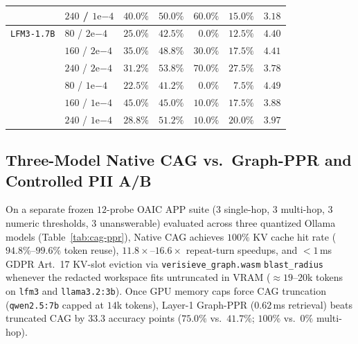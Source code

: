 \documentclass{article}
\begin{document}
\begin{table}[t]
\begin{center}
\begin{tabular}{llrrrrr}
 & $240$ / $1\mathrm{e}{-4}$ & $40.0\%$ & $50.0\%$ & $60.0\%$ & $15.0\%$ & $3.18$ \\
\midrule
\texttt{LFM3-1.7B} & $80$ / $2\mathrm{e}{-4}$ & $25.0\%$ & $42.5\%$ & $0.0\%$ & $12.5\%$ & $4.40$ \\
 & $160$ / $2\mathrm{e}{-4}$ & $35.0\%$ & $48.8\%$ & $30.0\%$ & $17.5\%$ & $4.41$ \\
 & $240$ / $2\mathrm{e}{-4}$ & $31.2\%$ & $53.8\%$ & $70.0\%$ & $27.5\%$ & $3.78$ \\
 & $80$ / $1\mathrm{e}{-4}$ & $22.5\%$ & $41.2\%$ & $0.0\%$ & $7.5\%$ & $4.49$ \\
 & $160$ / $1\mathrm{e}{-4}$ & $45.0\%$ & $45.0\%$ & $10.0\%$ & $17.5\%$ & $3.88$ \\
 & $240$ / $1\mathrm{e}{-4}$ & $28.8\%$ & $51.2\%$ & $10.0\%$ & $20.0\%$ & $3.97$ \\
\bottomrule
\end{tabular}
\end{center}
\vskip -0.14in
\end{table}

\subsection{Three-Model Native CAG vs.\ Graph-PPR and Controlled PII A/B}
On a separate frozen $12$-probe OAIC APP suite ($3$ single-hop, $3$ multi-hop, $3$ numeric thresholds, $3$ unanswerable) evaluated across three quantized Ollama models (Table~\ref{tab:cag-ppr}), Native CAG achieves $100\%$ KV cache hit rate ($94.8\%$--$99.6\%$ token reuse), $11.8\times$--$16.6\times$ repeat-turn speedups, and $<1$\,ms GDPR Art.~17 KV-slot eviction via \texttt{verisieve\_graph.wasm} \texttt{blast\_radius} whenever the redacted workspace fits untruncated in VRAM ($\approx 19$--$20$k tokens on \texttt{lfm3} and \texttt{llama3.2:3b}). Once GPU memory caps force CAG truncation (\texttt{qwen2.5:7b} capped at $14$k tokens), Layer-1 Graph-PPR ($0.62$\,ms retrieval) beats truncated CAG by $33.3$ accuracy points ($75.0\%$ vs.\ $41.7\%$; $100\%$ vs.\ $0\%$ multi-hop).
\end{document}

